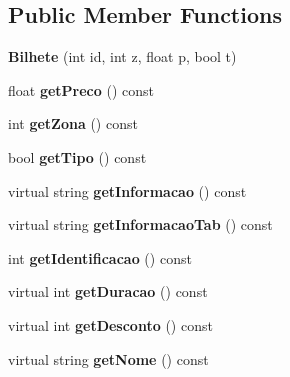 \subsection*{Public Member Functions}
\begin{DoxyCompactItemize}
\item 
\mbox{\label{classBilhete_a45c49169eb258af004eadd7762e48ba4}} 
{\bfseries Bilhete} (int id, int z, float p, bool t)
\item 
\mbox{\label{classBilhete_abb7d74fba0b97f216807e14ddadaf8c9}} 
float {\bfseries get\+Preco} () const
\item 
\mbox{\label{classBilhete_a181d6d9ee27e25bc8434ab74e6a80c17}} 
int {\bfseries get\+Zona} () const
\item 
\mbox{\label{classBilhete_a2a41f11e74646f65dbc3acf7fd2c9991}} 
bool {\bfseries get\+Tipo} () const
\item 
\mbox{\label{classBilhete_aed0fc2bba9092e59c7e669e4d2b7ca85}} 
virtual string {\bfseries get\+Informacao} () const
\item 
\mbox{\label{classBilhete_a078f542153dc785f32d756fb777d2d05}} 
virtual string {\bfseries get\+Informacao\+Tab} () const
\item 
\mbox{\label{classBilhete_aa39b48d96d2f1b52f3eed4257bb64b41}} 
int {\bfseries get\+Identificacao} () const
\item 
\mbox{\label{classBilhete_a1fcb306c872e66b2d786ee68c661939d}} 
virtual int {\bfseries get\+Duracao} () const
\item 
\mbox{\label{classBilhete_a82c741bf82878bacf49187068cd40de6}} 
virtual int {\bfseries get\+Desconto} () const
\item 
\mbox{\label{classBilhete_a03c8a1ac12710554dbb90e7fdb8a6335}} 
virtual string {\bfseries get\+Nome} () const
\end{DoxyCompactItemize}
